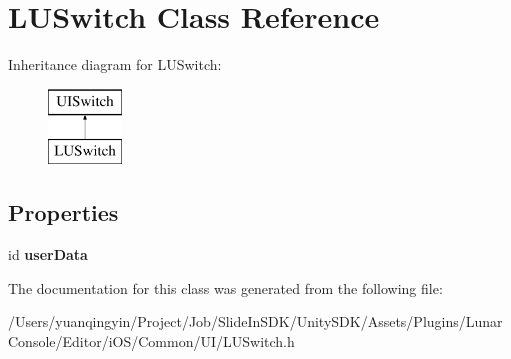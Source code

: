 \hypertarget{interface_l_u_switch}{}\section{L\+U\+Switch Class Reference}
\label{interface_l_u_switch}
Inheritance diagram for L\+U\+Switch\+:\begin{figure}[H]
\begin{center}
\leavevmode
\includegraphics[height=2.000000cm]{interface_l_u_switch}
\end{center}
\end{figure}
\subsection*{Properties}
\begin{DoxyCompactItemize}
\item 
\mbox{\label{interface_l_u_switch_a9dddd8c96cdd7d8db9788b5ca264499d}} 
id {\bfseries user\+Data}
\end{DoxyCompactItemize}


The documentation for this class was generated from the following file\+:\begin{DoxyCompactItemize}
\item 
/\+Users/yuanqingyin/\+Project/\+Job/\+Slide\+In\+S\+D\+K/\+Unity\+S\+D\+K/\+Assets/\+Plugins/\+Lunar\+Console/\+Editor/i\+O\+S/\+Common/\+U\+I/L\+U\+Switch.\+h\end{DoxyCompactItemize}
